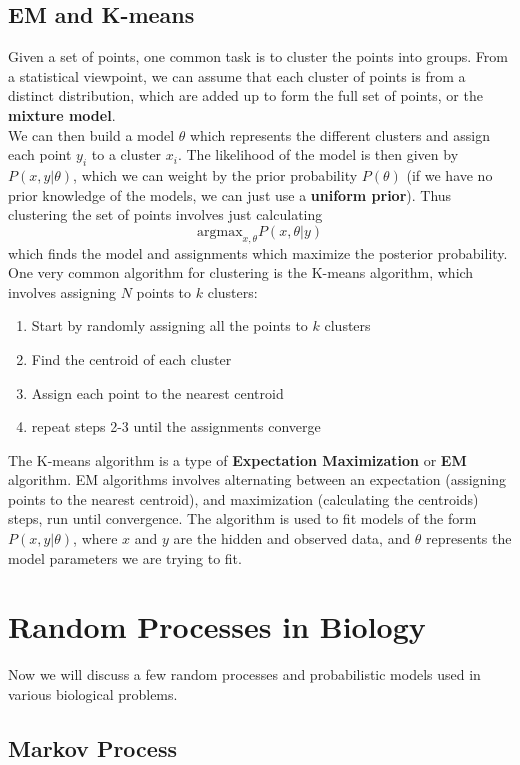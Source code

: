 \documentclass[12pt]{article}
\begin{document}
\subsection{EM and K-means}
Given a set of points, one common task is to cluster the points into groups. From a statistical viewpoint, we can assume that each cluster of points is from a distinct distribution, which are added up to form the full set of points, or the \textbf{mixture model}.\\[10pt]
We can then build a model $\theta$ which represents the different clusters and assign each point $y_i$ to a cluster $x_i$. The likelihood of the model is then given by $P(x,y|\theta)$, which we can weight by the prior probability $P(\theta)$ (if we have no prior knowledge of the models, we can just use a \textbf{uniform prior}). Thus clustering the set of points involves just calculating $$
\text{argmax}_{x,\theta} P(x,\theta|y)$$ which finds the model and assignments which maximize the posterior probability.\\[10pt]
One very common algorithm for clustering is the K-means algorithm, which involves assigning $N$ points to $k$ clusters:
\begin{enumerate}
    \item Start by randomly assigning all the points to $k$ clusters
    \item Find the centroid of each cluster
    \item Assign each point to the nearest centroid
    \item repeat steps 2-3 until the assignments converge
\end{enumerate}
The K-means algorithm is a type of \textbf{Expectation Maximization} or \textbf{EM} algorithm. EM algorithms involves alternating between an expectation (assigning points to the nearest centroid), and maximization (calculating the centroids) steps, run until convergence. The algorithm is used to fit models of the form $P(x,y|\theta)$, where $x$ and $y$ are the hidden and observed data, and $\theta$ represents the model parameters we are trying to fit.

\section{Random Processes in Biology}
Now we will discuss a few random processes and probabilistic models used in various biological problems.
\subsection{Markov Process}
\end{document}
